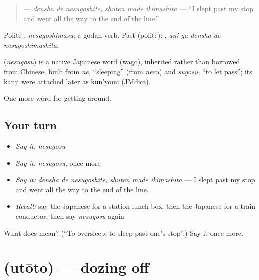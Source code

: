 \begin{quote}
\textbf{  } — \emph{densha de nesugoshite, shūten made ikimashita} — \textquotedblleft{}I slept past my stop and went all the way to the end of the line.\textquotedblright{}
\end{quote}

Polite \textbf{}, \emph{nesugoshimasu}; a godan verb. Past (polite): \textbf{  }, \emph{ani ga densha de nesugoshimashita}.

\begin{cousinweb}
\textbf{} (\emph{nesugosu}) is a native Japanese word (wago), inherited rather than borrowed from Chinese, built from \emph{ne}, \textquotedblleft{}sleeping\textquotedblright{} (from \emph{neru}) and \emph{sugosu}, \textquotedblleft{}to let pass\textquotedblright{}; its kanji were attached later as kun'yomi (JMdict).
\end{cousinweb}

\begin{grammarlens}[title={What you've built}]
One more word for getting around.
\end{grammarlens}

\subsection*{Your turn}
\begin{itemize}
\raggedright
  \item \emph{Say it:} \emph{nesugosu}
  \item \emph{Say it:} \emph{nesugosu}, once more
  \item \emph{Say it:} \emph{densha de nesugoshite, shūten made ikimashita} — I slept past my stop and went all the way to the end of the line.
  \item \emph{Recall:} say the Japanese for a station lunch box, then the Japanese for a train conductor, then say \emph{nesugosu} again
\end{itemize}

\begin{tcolorbox}[breakable,colback=teal!4,colframe=teal!35!black,title={Before you move on}]
What does  mean? (\textquotedblleft{}To oversleep; to sleep past one's stop\textquotedblright{}.) Say it once more.
\end{tcolorbox}
\section[\texorpdfstring{\ja{うとうと} (utōto)}{うとうと (utōto)}]{ (utōto) — dozing off}


